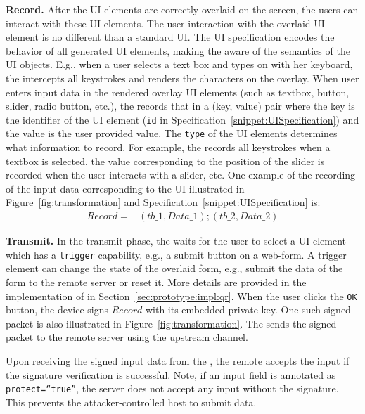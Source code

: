 \begin{mylist}
\item \textbf{Record.} After the UI elements are correctly overlaid on the screen, the users can interact with these UI elements. The user interaction with the overlaid UI element is no different than a standard UI. The UI specification encodes the behavior of all generated UI elements, making the \device aware of the semantics of the UI objects. E.g., when a user selects a text box and types on with her keyboard, the \device intercepts all keystrokes and renders the characters on the overlay.
When user enters input data in the rendered overlay UI elements (such as textbox, button, slider, radio button, etc.), the \device records that in a (key, value) pair where the key is the identifier of the UI element (\texttt{id} in Specification~\ref{snippet:UISpecification}) and the value is the user provided value. The \texttt{type} of the UI elements determines what information to record. For example, the \device records all keystrokes when a textbox is selected, the value corresponding to the position of the slider is recorded when the user interacts with a slider, etc. One example of the recording of the input data corresponding to the UI illustrated in Figure~\ref{fig:transformation} and Specification~\ref{snippet:UISpecification} is: 
\begin{align*}
Record = & (tb\_1, Data\_1);(tb\_2,Data\_2)
\end{align*}

\item \textbf{Transmit.} In the transmit phase, the \device waits for the user to select a UI element which has a \texttt{trigger} capability, e.g., a submit button on a web-form. A trigger element can change the state of the overlaid form, e.g., submit the data of the form to the remote server or reset it. More details are provided in the implementation of \name in Section~\ref{sec:prototype:impl:qr}. When the user clicks the \texttt{OK} button, the device signs $Record$ with its embedded private key. One such signed packet is also illustrated in Figure~\ref{fig:transformation}. The \device sends the signed packet to the remote server using the upstream channel.
\end{mylist} 

Upon receiving the signed input data from the \device, the remote accepts the input if the signature verification is successful. Note, if an input field is annotated as \texttt{protect=``true''}, the server does not accept any input without the \device signature. This prevents the attacker-controlled host to submit data. 

